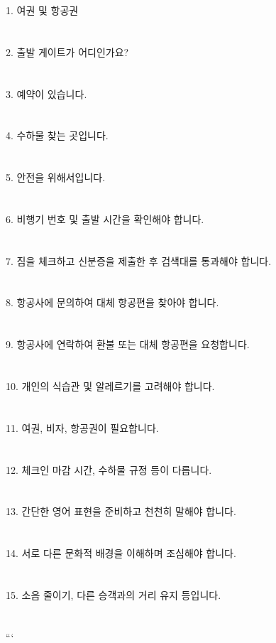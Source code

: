 \documentclass[fleqn]{article}
\begin{document}
1. 여권 및 항공권 \\\\\\
2. 출발 게이트가 어디인가요? \\\\\\
3. 예약이 있습니다. \\\\\\
4. 수하물 찾는 곳입니다. \\\\\\
5. 안전을 위해서입니다. \\\\\\
6. 비행기 번호 및 출발 시간을 확인해야 합니다. \\\\\\
7. 짐을 체크하고 신분증을 제출한 후 검색대를 통과해야 합니다. \\\\\\
8. 항공사에 문의하여 대체 항공편을 찾아야 합니다. \\\\\\
9. 항공사에 연락하여 환불 또는 대체 항공편을 요청합니다. \\\\\\
10. 개인의 식습관 및 알레르기를 고려해야 합니다. \\\\\\
11. 여권, 비자, 항공권이 필요합니다. \\\\\\
12. 체크인 마감 시간, 수하물 규정 등이 다릅니다. \\\\\\
13. 간단한 영어 표현을 준비하고 천천히 말해야 합니다. \\\\\\
14. 서로 다른 문화적 배경을 이해하며 조심해야 합니다. \\\\\\
15. 소음 줄이기, 다른 승객과의 거리 유지 등입니다. \\\\\\
```      
        
\end{document}
